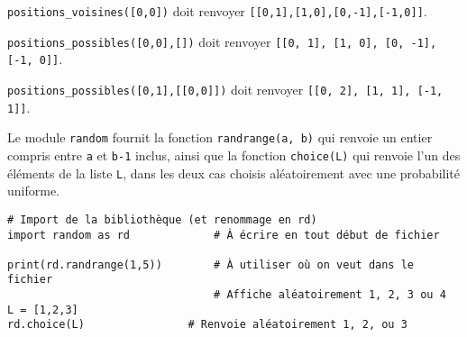 
\begin{test}
\lstinline{positions_voisines([0,0])} doit renvoyer \lstinline{[[0,1],[1,0],[0,-1],[-1,0]]}.
\end{test}






\begin{test}
\lstinline{positions_possibles([0,0],[])} doit renvoyer \lstinline{[[0, 1], [1, 0], [0, -1], [-1, 0]]}.

\lstinline{positions_possibles([0,1],[[0,0]])} doit renvoyer \lstinline{[[0, 2], [1, 1], [-1, 1]]}.
\end{test}






Le module \lstinline{random} fournit la fonction \lstinline{randrange(a, b)} qui renvoie un entier compris entre \lstinline{a} et \lstinline{b-1} inclus, ainsi que la fonction \lstinline{choice(L)} qui renvoie l’un des éléments de la liste \lstinline{L}, dans les deux cas choisis aléatoirement avec une probabilité uniforme.

\begin{lstlisting}
# Import de la bibliothèque (et renommage en rd)
import random as rd 			# À écrire en tout début de fichier

print(rd.randrange(1,5))		# À utiliser où on veut dans le fichier
        						# Affiche aléatoirement 1, 2, 3 ou 4
L = [1,2,3]
rd.choice(L)				# Renvoie aléatoirement 1, 2, ou 3

\end{lstlisting}

